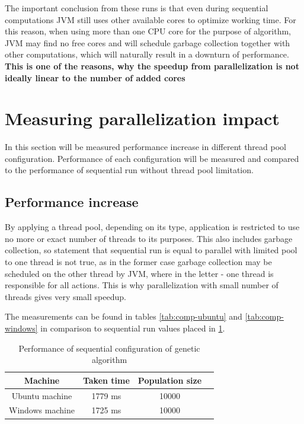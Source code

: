 The important conclusion from these runs is that even during sequential computations JVM still uses other available cores to optimize working time. For this reason, when using more than one CPU core for the purpose of algorithm, JVM may find no free cores and will schedule garbage collection together with other computations, which will naturally result in a downturn of performance. \textbf{This is one of the reasons, why the speedup from parallelization is not ideally linear to the number of added cores}


\section{Measuring parallelization impact}

In this section will be measured performance increase in different thread pool configuration.
Performance of each configuration will be measured and compared to the performance of sequential run without thread pool limitation. 

\subsection{Performance increase}

By applying a thread pool, depending on its type, application is restricted to use no more or exact number of threads to its purposes. This also includes garbage collection, so statement that sequential run is equal to parallel with limited pool to one thread is not true, as in the former case garbage collection may be scheduled on the other thread by JVM, where in the letter - one thread is responsible for all actions. This is why parallelization with small number of threads gives very small speedup.

The measurements can be found in tables \ref{tab:comp-ubuntu} and \ref{tab:comp-windows} in comparison to sequential run values placed in \ref{tab:win-ub-perf}.

\begin{table}[h]
\centering\caption{Performance of sequential configuration of genetic algorithm \label{tab:win-ub-perf}}
\begin{tabular}{|c|c|c|c|}
\hline
\textbf{Machine} & \textbf{Taken time} & \textbf{Population size} \\
\hline
 Ubuntu machine & 1779 ms & 10000 \\
\hline
 Windows machine & 1725 ms & 10000 \\
\hline
\end{tabular}
\end{table}

